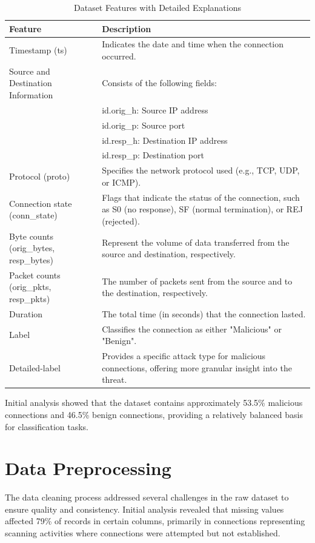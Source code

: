 \begin{table}[h]
\centering
\begin{tabular}{lp{}}
\hline
\textbf{Feature} & \textbf{Description} \\
\hline
Timestamp (ts) & Indicates the date and time when the connection occurred. \\
\hline
Source and Destination Information & Consists of the following fields: \\
 & \quad id.orig\_h: Source IP address \\
 & \quad id.orig\_p: Source port \\
 & \quad id.resp\_h: Destination IP address \\
 & \quad id.resp\_p: Destination port \\
\hline
Protocol (proto) & Specifies the network protocol used (e.g., TCP, UDP, or ICMP). \\
\hline
Connection state (conn\_state) & Flags that indicate the status of the connection, such as S0 (no response), SF (normal termination), or REJ (rejected). \\
\hline
Byte counts (orig\_bytes, resp\_bytes) & Represent the volume of data transferred from the source and destination, respectively. \\
\hline
Packet counts (orig\_pkts, resp\_pkts) & The number of packets sent from the source and to the destination, respectively. \\
\hline
Duration & The total time (in seconds) that the connection lasted. \\
\hline
Label & Classifies the connection as either "Malicious" or "Benign". \\
\hline
Detailed-label & Provides a specific attack type for malicious connections, offering more granular insight into the threat. \\
\hline
\end{tabular}
\caption{Dataset Features with Detailed Explanations}
\label{tab:dataset_features}
\end{table}

Initial analysis showed that the dataset contains approximately 53.5\% malicious connections and 46.5\% benign connections, providing a relatively balanced basis for classification tasks.

\section{Data Preprocessing}

The data cleaning process addressed several challenges in the raw dataset to ensure quality and consistency. Initial analysis revealed that missing values affected 79\% of records in certain columns, primarily in connections representing scanning activities where connections were attempted but not established.

